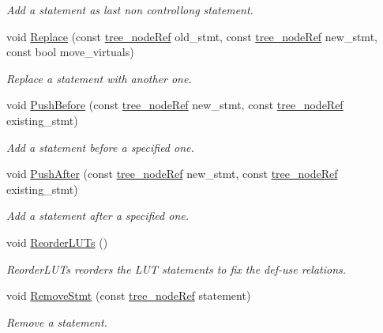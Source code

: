 \begin{DoxyCompactItemize}
\begin{DoxyCompactList}\small\item\em Add a statement as last non controllong statement. \end{DoxyCompactList}\item 
void \hyperlink{structbloc_abe24c6557b28cc9ece43884022766ea8}{Replace} (const \hyperlink{tree__node_8hpp_a6ee377554d1c4871ad66a337eaa67fd5}{tree\+\_\+node\+Ref} old\+\_\+stmt, const \hyperlink{tree__node_8hpp_a6ee377554d1c4871ad66a337eaa67fd5}{tree\+\_\+node\+Ref} new\+\_\+stmt, const bool move\+\_\+virtuals)
\begin{DoxyCompactList}\small\item\em Replace a statement with another one. \end{DoxyCompactList}\item 
void \hyperlink{structbloc_a3ac7907a4422bb34f52206b6db4bf22f}{Push\+Before} (const \hyperlink{tree__node_8hpp_a6ee377554d1c4871ad66a337eaa67fd5}{tree\+\_\+node\+Ref} new\+\_\+stmt, const \hyperlink{tree__node_8hpp_a6ee377554d1c4871ad66a337eaa67fd5}{tree\+\_\+node\+Ref} existing\+\_\+stmt)
\begin{DoxyCompactList}\small\item\em Add a statement before a specified one. \end{DoxyCompactList}\item 
void \hyperlink{structbloc_a8469a1745da35d47c60c64bedb455d99}{Push\+After} (const \hyperlink{tree__node_8hpp_a6ee377554d1c4871ad66a337eaa67fd5}{tree\+\_\+node\+Ref} new\+\_\+stmt, const \hyperlink{tree__node_8hpp_a6ee377554d1c4871ad66a337eaa67fd5}{tree\+\_\+node\+Ref} existing\+\_\+stmt)
\begin{DoxyCompactList}\small\item\em Add a statement after a specified one. \end{DoxyCompactList}\item 
void \hyperlink{structbloc_a3f4b8d5c91289b27e92552a962b2567a}{Reorder\+L\+U\+Ts} ()
\begin{DoxyCompactList}\small\item\em Reorder\+L\+U\+Ts reorders the L\+UT statements to fix the def-\/use relations. \end{DoxyCompactList}\item 
void \hyperlink{structbloc_a9193321bf36b0bcbd263406ea0021ff4}{Remove\+Stmt} (const \hyperlink{tree__node_8hpp_a6ee377554d1c4871ad66a337eaa67fd5}{tree\+\_\+node\+Ref} statement)
\begin{DoxyCompactList}\small\item\em Remove a statement. \end{DoxyCompactList}\item 

\end{DoxyCompactItemize}
